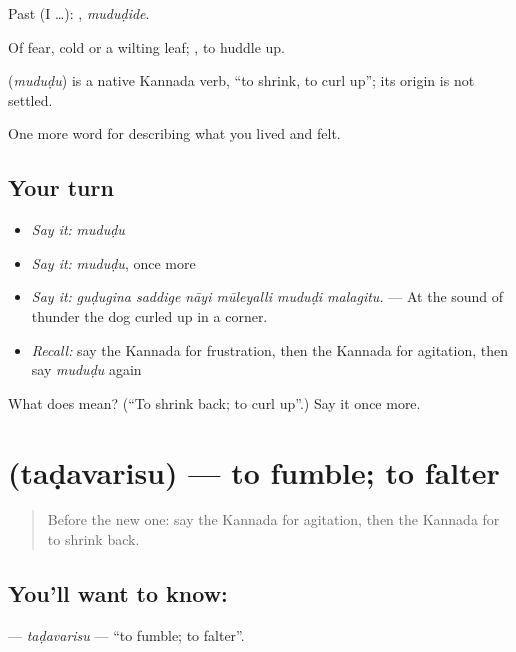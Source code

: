 Past (I …): , \emph{muduḍide}.

Of fear, cold or a wilting leaf; , to huddle up.

\begin{cousinweb}
\textbf{} (\emph{muduḍu}) is a native Kannada verb, \textquotedblleft{}to shrink, to curl up\textquotedblright{}; its origin is not settled.
\end{cousinweb}

\begin{grammarlens}[title={What you've built}]
One more word for describing what you lived and felt.
\end{grammarlens}

\subsection*{Your turn}
\begin{itemize}
\raggedright
  \item \emph{Say it:} \emph{muduḍu}
  \item \emph{Say it:} \emph{muduḍu}, once more
  \item \emph{Say it:} \emph{guḍugina saddige nāyi mūleyalli muduḍi malagitu.} — At the sound of thunder the dog curled up in a corner.
  \item \emph{Recall:} say the Kannada for frustration, then the Kannada for agitation, then say \emph{muduḍu} again
\end{itemize}

\begin{tcolorbox}[breakable,colback=teal!4,colframe=teal!35!black,title={Before you move on}]
What does  mean? (\textquotedblleft{}To shrink back; to curl up\textquotedblright{}.) Say it once more.
\end{tcolorbox}
\section[\texorpdfstring{\kn{ತಡವರಿಸು} (taḍavarisu)}{ತಡವರಿಸು (taḍavarisu)}]{ (taḍavarisu) — to fumble; to falter}

\label{lesson:KA-C494-tadavarisu}



\begin{quote}
Before the new one: say the Kannada for agitation, then the Kannada for to shrink back.
\end{quote}

\subsection*{You'll want to know: }
\textbf{} — \emph{taḍavarisu} — \textquotedblleft{}to fumble; to falter\textquotedblright{}.

